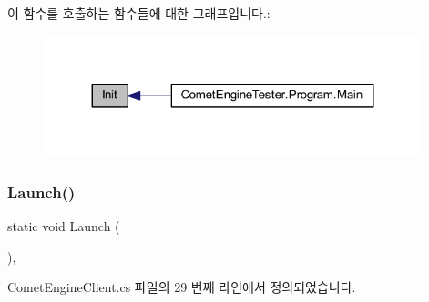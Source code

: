 이 함수를 호출하는 함수들에 대한 그래프입니다.\+:\nopagebreak
\begin{figure}[H]
\begin{center}
\leavevmode
\includegraphics[width=311pt]{class_comet_engine_1_1_client_1_1_comet_engine_client_af5f8db49a5de5bb41cf935066d21f5aa_icgraph}
\end{center}
\end{figure}
\mbox{\label{class_comet_engine_1_1_client_1_1_comet_engine_client_aee7b13887a71ba1fcd42c5fbccf124d4}} 
\subsubsection{\texorpdfstring{Launch()}{Launch()}}
{\footnotesize\ttfamily static void Launch (\begin{DoxyParamCaption}{ }\end{DoxyParamCaption})\hspace{0.3cm}{\ttfamily [inline]}, {\ttfamily [static]}}



Comet\+Engine\+Client.\+cs 파일의 29 번째 라인에서 정의되었습니다.


